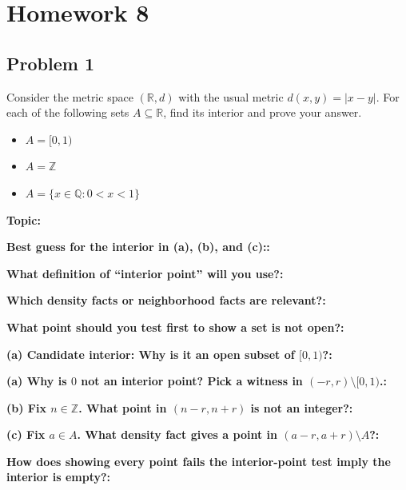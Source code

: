 \documentclass[12pt]{article}
\newcommand{\fillfield}[1]{%
  \par\noindent\textbf{#1:}\enspace\hrulefill\par\vspace{3pt}%
}
\begin{document}
\section{Homework 8}

\newpage
\subsection{Problem 1}

\begin{tcolorbox}[
  enhanced, breakable,
  colback  = probblue,
  colframe = blue!55!black,
  fonttitle = \bfseries,
  title = {\textsc{Problem Statement}\hfill Homework 8, Problem 1}
]
Consider the metric space $(\mathbb{R}, d)$ with the usual metric $d(x, y) = |x-y|$. For
each of the following sets $A \subseteq \mathbb{R}$, find its interior and prove your answer.
\begin{itemize}[nosep, leftmargin=1.8em]
  \item[(a)] $A = [0, 1)$
  \item[(b)] $A = \mathbb{Z}$
  \item[(c)] $A = \{x \in \mathbb{Q} : 0 < x < 1\}$
\end{itemize}
\end{tcolorbox}

\bigskip

\begin{tcolorbox}[
  enhanced, breakable,
  colback  = pass1green,
  colframe = green!55!black,
  fonttitle = \bfseries,
  title = {Pass 1 \enspace\textbf{--}\enspace First Diagnosis}
]
\fillfield{Topic}
\fillfield{Best guess for the interior in (a), (b), and (c):}
\fillfield{What definition of ``interior point'' will you use?}
\fillfield{Which density facts or neighborhood facts are relevant?}
\fillfield{What point should you test first to show a set is not open?}
\end{tcolorbox}

\bigskip

\begin{tcolorbox}[
  enhanced, breakable,
  colback  = pass2yellow,
  colframe = yellow!65!black,
  fonttitle = \bfseries,
  title = {Pass 2 \enspace\textbf{--}\enspace Proof Recipe Card}
]
\fillfield{(a) Candidate interior: \hspace{1cm} Why is it an open subset of $[0,1)$?}
\fillfield{(a) Why is $0$ not an interior point? Pick a witness in $(-r,r)\setminus [0,1)$.}
\fillfield{(b) Fix $n \in \mathbb{Z}$. What point in $(n-r,n+r)$ is not an integer?}
\fillfield{(c) Fix $a \in A$. What density fact gives a point in $(a-r,a+r)\setminus A$?}
\fillfield{How does showing every point fails the interior-point test imply the interior is empty?}
\end{tcolorbox}
\end{document}
